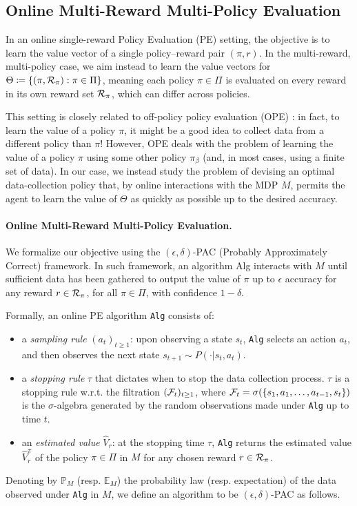 \subsection{Online Multi-Reward Multi-Policy Evaluation}
In an online single-reward Policy Evaluation (PE) setting, the objective is to learn the value vector of a single policy–reward pair $(\pi,r)$. In the multi-reward, multi-policy case, we aim instead to learn the value vectors for $\Theta\coloneqq\{(\pi, {\cal R}_\pi): \pi\in \Pi\}$, meaning each policy $\pi\in \Pi$ is evaluated on every reward in its own reward set  ${\cal R}_\pi$, which can differ across policies. 


This setting is closely related to off-policy policy evaluation (OPE) \citep{thomas2016data,precup2000eligibility}: in fact, to learn the value of a policy $\pi$, it might be a good idea to collect data from a different policy than $\pi$! However, OPE deals with the problem of learning the value of a policy $\pi$ using some other policy $\pi_\beta$ (and, in most cases, using a finite set of data). 
In our case, we instead study the problem of devising an optimal data-collection policy that, by online interactions with the MDP $M$, permits the agent to learn the value of $\Theta$ as quickly as possible up to the desired accuracy.

\paragraph{Online Multi-Reward Multi-Policy Evaluation.} We formalize our objective using the $(\epsilon,\delta)$-PAC (Probably Approximately Correct) framework. In such framework, an algorithm {\rm Alg} interacts with $M$ until sufficient data has been gathered to output the value of $\pi$ up to $\epsilon$ accuracy for any reward $r\in {\cal R}_\pi$, for  all $\pi\in \Pi$, with confidence $1-\delta$. 

Formally, an online PE algorithm \texttt{Alg} consists of:
\begin{itemize}[topsep=-5px,partopsep=0px,nosep]
    \item  a \textit{sampling rule} $(a_t)_{t\ge 1}$: upon observing  a state $s_t$, {\tt Alg} selects an action $a_t$, and then observes the next state $s_{t+1} \sim P(\cdot|s_t,a_t)$.
    \item  a \textit{stopping rule} $\tau$ that dictates when to stop the data collection process. $\tau$ is a stopping rule w.r.t. the filtration $({\cal F}_t)_{t\geq 1}$, where ${\cal F}_t=\sigma(\{s_1,a_1,\dots,a_{t-1},s_t\})$  is the $\sigma$-algebra generated by the random observations made under {\tt Alg} up to time $t$. 
    \item  an  \textit{estimated value} $\hat V_r$: at the stopping time $\tau$, {\tt Alg} returns the estimated value $\hat V_r^\pi$ of the policy $\pi\in \Pi$ in $M$ for any chosen reward $r\in {\cal R}_\pi$.
\end{itemize}
Denoting by $\mathbb{P}_M$ (resp. $\mathbb{E}_M$) the probability law (resp. expectation) of the data observed under {\tt Alg} in $M$, we define an algorithm to be $(\epsilon,\delta)$-PAC as follows.

